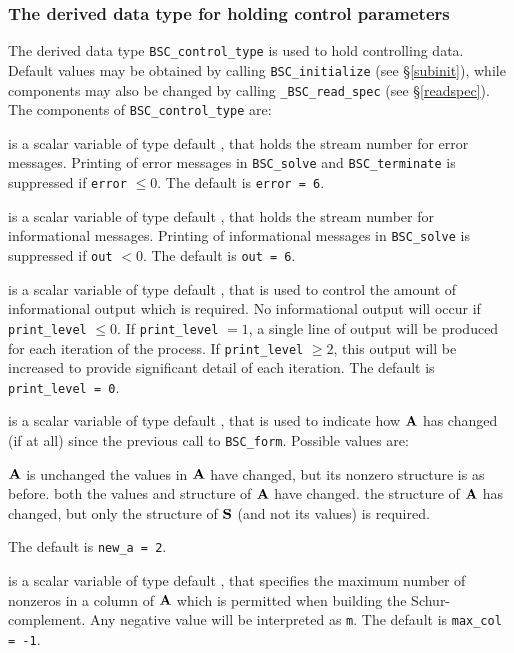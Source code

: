 \documentclass{galahad}
\newcommand{\packagename}{BSC}
\newcommand{\fullpackagename}{\libraryname\_\packagename}
\begin{document}

\subsubsection{The derived data type for holding control
 parameters}\label{typecontrol}
The derived data type
{\tt \packagename\_control\_type}
is used to hold controlling data. Default values may be obtained by calling
{\tt \packagename\_initialize}
(see \S\ref{subinit}),
while components may also be changed by calling
{\tt \fullpackagename\_read\-\_spec}
(see \S\ref{readspec}).
The components of
{\tt \packagename\_control\_type}
are:

\begin{description}

 is a scalar variable of type default \integer, that holds the
stream number for error messages. Printing of error messages in
{\tt \packagename\_solve} and {\tt \packagename\_terminate}
is suppressed if {\tt error} $\leq 0$.
The default is {\tt error = 6}.

 is a scalar variable of type default \integer, that holds the
stream number for informational messages. Printing of informational messages in
{\tt \packagename\_solve} is suppressed if {\tt out} $< 0$.
The default is {\tt out = 6}.

 is a scalar variable of type default \integer, that is used
to control the amount of informational output which is required. No
informational output will occur if {\tt print\_level} $\leq 0$. If
{\tt print\_level} $= 1$, a single line of output will be produced for each
iteration of the process. If {\tt print\_level} $\geq 2$, this output will be
increased to provide significant detail of each iteration.
The default is {\tt print\_level = 0}.

 is a scalar variable of type default \integer, that is used
to indicate how ${\mathbf{A}}$ has changed (if at all) since the previous call
to {\tt BSC\_form}. Possible values are:
\begin{description}
 ${\mathbf{A}}$ is unchanged
 the values in ${\mathbf{A}}$ have changed, but its nonzero structure
is as before.
 both the values and structure of ${\mathbf{A}}$ have changed.
 the structure of ${\mathbf{A}}$ has changed, but only the structure of
${\mathbf{S}}$ (and not its values) is required.
\end{description}
The default is {\tt new\_a = 2}.

 is a scalar variable of type default \integer, that specifies
the maximum number of nonzeros in a column of ${\mathbf{A}}$ which is permitted
when building the Schur-complement. Any negative value will be interpreted
as {\tt m}.
The default is {\tt max\_col = -1}.


\end{description}
\end{document}
